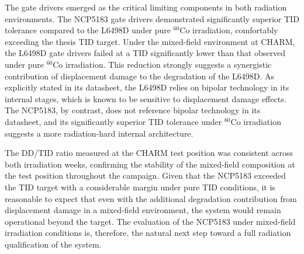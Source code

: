 The gate drivers emerged as the critical limiting components in both radiation environments. The NCP5183 gate drivers demonstrated significantly superior TID tolerance compared to the L6498D under pure $^{60}$Co irradiation, comfortably exceeding the thesis TID target. Under the mixed-field environment at CHARM, the L6498D gate drivers failed at a TID significantly lower than that observed under pure $^{60}$Co irradiation. This reduction strongly suggests a synergistic contribution of displacement damage to the degradation of the L6498D. As explicitly stated in its datasheet, the L6498D relies on bipolar technology in its internal stages, which is known to be sensitive to displacement damage effects. The NCP5183, by contrast, does not reference bipolar technology in its datasheet, and its significantly superior TID tolerance under $^{60}$Co irradiation suggests a more radiation-hard internal architecture.

The DD/TID ratio measured at the CHARM test position was consistent across both irradiation weeks, confirming the stability of the mixed-field composition at the test position throughout the campaign. Given that the NCP5183 exceeded the TID target with a considerable margin under pure TID conditions, it is reasonable to expect that even with the additional degradation contribution from displacement damage in a mixed-field environment, the system would remain operational beyond the target. The evaluation of the NCP5183 under mixed-field irradiation conditions is, therefore, the natural next step toward a full radiation qualification of the system.